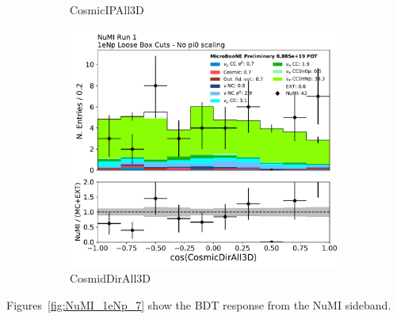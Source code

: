 \begin{figure}[H]
\begin{subfigure}{0.3\textwidth}
    \caption{CosmicIPAll3D}
    \end{subfigure}
    \begin{subfigure}{0.3\textwidth}
    \includegraphics[width=1.0\textwidth]{Sidebands/Figures/NuMI/1eNp/CosmicDirAll3D.pdf}
    \caption{CosmidDirAll3D}
    \end{subfigure}
    \caption{} 
    \label{fig:NuMI_1eNp_5}
\end{figure}


Figures~\ref{fig:NuMI_1eNp_7} show the BDT response from the \npsel NuMI sideband.

